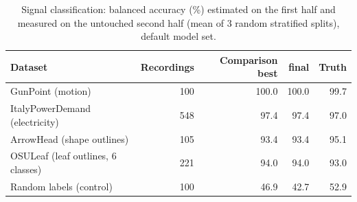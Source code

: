 \begin{table}[t]
\centering\small
\caption{Signal classification: balanced accuracy (\%) estimated on the first half and measured on the untouched second half (mean of 3 random stratified splits), default model set.}
\label{tab:signals}
\begin{tabular}{@{}lrrrr@{}}
\toprule
Dataset & Recordings & Comparison best & \ER{} final & Truth \\
\midrule
GunPoint (motion) & 100 & 100.0 & 100.0 & 99.7 \\
ItalyPowerDemand (electricity) & 548 & 97.4 & 97.4 & 97.0 \\
ArrowHead (shape outlines) & 105 & 93.4 & 93.4 & 95.1 \\
OSULeaf (leaf outlines, 6 classes) & 221 & 94.0 & 94.0 & 93.0 \\
\midrule
Random labels (control) & 100 & 46.9 & 42.7 & 52.9 \\
\bottomrule
\end{tabular}
\end{table}
